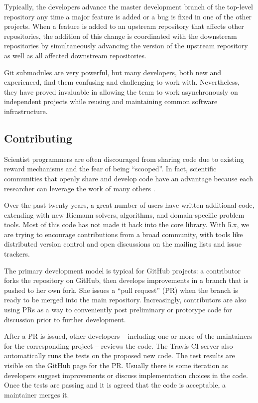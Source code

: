 Typically, the \clawpack developers advance the master development
branch of the top-level repository any time a major feature is added
or a bug is fixed in one of the other projects.  When a feature is
added to an upstream repository that affects other repositories, the
addition of this change is coordinated with the downstream
repositories by simultaneously advancing the version of the upstream
repository as well as all affected downstream repositories.

Git submodules are very powerful, but many developers, both new and
experienced, find them confusing and challenging to work with.
Nevertheless, they have proved invaluable in allowing the \clawpack team to
work asynchronously on independent projects while reusing and maintaining
common software infrastructure.

\subsection{Contributing}

Scientist programmers are often discouraged from sharing code
due to existing reward mechanisms and the fear of being ``scooped''.
In fact, scientific communities that openly share and develop code
have an advantage because each researcher can leverage the work of
many others \cite{Turk:2013hd}.

Over the past twenty years, a great number of users have written
additional code, extending \clawpack with new Riemann solvers,
algorithms, and domain-specific problem tools.  Most of this code
has not made it back into the core library.  With \clawpack 5.x,
we are trying to encourage contributions from a broad community, with
tools like distributed version control and open discussions on 
the mailing lists and issue trackers.

The primary development model is typical for GitHub projects: a
contributor forks the repository on GitHub, then develops improvements
in a branch that is pushed to her own fork.  She issues a ``pull
request'' (PR) when the branch is ready to be merged into the main
repository.  Increasingly, contributors are also using PRs as a way to
conveniently post preliminary or prototype code for discussion prior
to further development.

After a PR is issued, other developers -- including one or more of the
maintainers for the corresponding project -- reviews the code.  The Travis
CI server also automatically runs the tests on the proposed new code.  The test
results are visible on the GitHub page for the PR.  Usually there is
some iteration as developers suggest improvements or discuss
implementation choices in the code.  Once the tests are passing and it
is agreed that the code is acceptable, a maintainer merges it.


